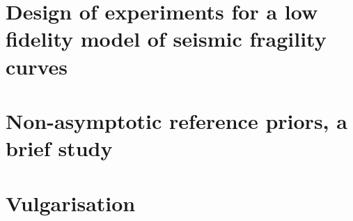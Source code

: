 \documentclass[a4paper]{book}
\renewcommand{\familydefault}{\sfdefault}
\begin{document}


\chapter{Design of experiments for a low fidelity model of seismic fragility curves}\label{app:chap:ESAIM}




\chapter{Non-asymptotic reference priors, a brief study}\label{app:chap:nonasympt}







\renewcommand{\thechapter}{\symbolchapt{chapter}}%


\chapter{Vulgarisation \lastappsymbol}


 

\printbibliography[heading=chapter,title=Bibliography]

\fancyhead{}
\newpage
\pagestyle{empty}
\backmatter
\ \cleardoublepage
\ \newpage
\renewcommand{\familydefault}{\sfdefault}
%
%
%
%
%
\end{document}
